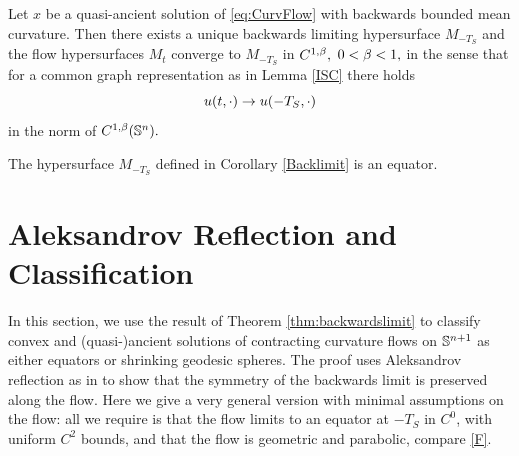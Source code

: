\documentclass{amsart}
\begin{document}
\begin{cor}\label{Backlimit}
Let $x$ be a quasi-ancient solution of \eqref{eq:CurvFlow} with backwards bounded mean curvature. Then there exists a unique backwards limiting hypersurface $M_{-T_S}$ and the flow hypersurfaces $M_t$ converge to $M_{-T_S}$ in $C^{1,\b},$ $0<\b<1,$ in the sense that for a common graph representation as in Lemma \ref{ISC} there holds
$$u(t,\cdot)\ra u(-T_S,\cdot)$$
in the norm of $C^{1,\b}(\S^n).$
\end{cor}
\begin{thm}
\label{thm:backwardslimit}
The hypersurface $M_{-T_S}$ defined in Corollary \ref{Backlimit} is an equator.
\end{thm}
\section{Aleksandrov Reflection and Classification}\label{sec:reflection}
In this section, we use the result of Theorem \ref{thm:backwardslimit} to classify convex and (quasi-)ancient solutions of contracting curvature flows on \(\S^{n+1}\) as either equators or shrinking geodesic spheres. The proof uses Aleksandrov reflection as in \cite{2015arXiv150802821B,bryanlouie} to show that the symmetry of the backwards limit is preserved along the flow. Here we give a very general version with minimal assumptions on the flow: all we require is that the flow limits to an equator at $-T_S$ in \(C^0\), with uniform \(C^2\) bounds, and that the flow is geometric and parabolic, compare \cref{F}.
\end{document}
